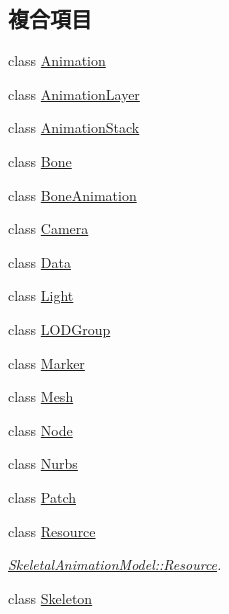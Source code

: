 \subsection*{複合項目}
\begin{DoxyCompactItemize}
\item 
class \hyperlink{class_i_dream_sky_1_1_skeletal_animation_model_1_1_animation}{Animation}
\item 
class \hyperlink{class_i_dream_sky_1_1_skeletal_animation_model_1_1_animation_layer}{Animation\+Layer}
\item 
class \hyperlink{class_i_dream_sky_1_1_skeletal_animation_model_1_1_animation_stack}{Animation\+Stack}
\item 
class \hyperlink{class_i_dream_sky_1_1_skeletal_animation_model_1_1_bone}{Bone}
\item 
class \hyperlink{class_i_dream_sky_1_1_skeletal_animation_model_1_1_bone_animation}{Bone\+Animation}
\item 
class \hyperlink{class_i_dream_sky_1_1_skeletal_animation_model_1_1_camera}{Camera}
\item 
class \hyperlink{class_i_dream_sky_1_1_skeletal_animation_model_1_1_data}{Data}
\item 
class \hyperlink{class_i_dream_sky_1_1_skeletal_animation_model_1_1_light}{Light}
\item 
class \hyperlink{class_i_dream_sky_1_1_skeletal_animation_model_1_1_l_o_d_group}{L\+O\+D\+Group}
\item 
class \hyperlink{class_i_dream_sky_1_1_skeletal_animation_model_1_1_marker}{Marker}
\item 
class \hyperlink{class_i_dream_sky_1_1_skeletal_animation_model_1_1_mesh}{Mesh}
\item 
class \hyperlink{class_i_dream_sky_1_1_skeletal_animation_model_1_1_node}{Node}
\item 
class \hyperlink{class_i_dream_sky_1_1_skeletal_animation_model_1_1_nurbs}{Nurbs}
\item 
class \hyperlink{class_i_dream_sky_1_1_skeletal_animation_model_1_1_patch}{Patch}
\item 
class \hyperlink{class_i_dream_sky_1_1_skeletal_animation_model_1_1_resource}{Resource}
\begin{DoxyCompactList}\small\item\em \hyperlink{class_i_dream_sky_1_1_skeletal_animation_model_1_1_resource}{Skeletal\+Animation\+Model\+::\+Resource}. \end{DoxyCompactList}\item 
class \hyperlink{class_i_dream_sky_1_1_skeletal_animation_model_1_1_skeleton}{Skeleton}
\end{DoxyCompactItemize}

